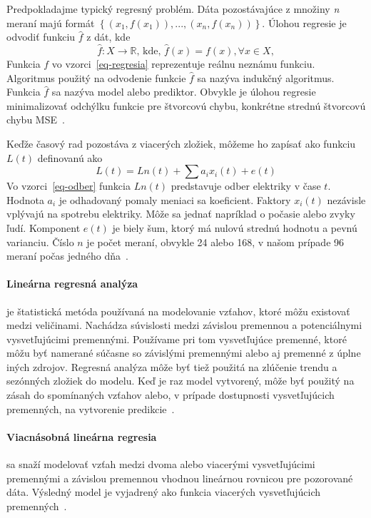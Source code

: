 \documentclass[a4paper,slovak,12pt,appendix]{article}
\begin{document}
Predpokladajme typický regresný problém. Dáta pozostávajúce z množiny \textit{n}
meraní majú formát $\left\{(x_1, f(x_1)), ..., (x_n, f(x_n))\right\}$.
Úlohou regresie je odvodiť funkciu $\hat{f}$ z dát, kde
\begin{equation}
  \hat{f} : X \to \mathbb{R} \text{, kde, } \hat{f}(x) = f(x), \forall x \in X,
  \label{eq-regresia}
\end{equation}
Funkcia $f$ vo vzorci~\ref{eq-regresia} reprezentuje reálnu neznámu
funkciu. Algoritmus použitý na odvodenie funkcie $\hat{f}$ sa nazýva
indukčný algoritmus. Funkcia $\hat{f}$ sa nazýva model alebo
prediktor. Obvykle je úlohou regresie minimalizovať odchýlku funkcie pre
štvorcovú chybu, konkrétne strednú štvorcovú chybu MSE~\cite{Mendes-Moreira2012}.

Keďže časový rad pozostáva z viacerých zložiek, môžeme ho zapísať ako funkciu
$L(t)$ definovanú ako
\begin{equation}
  L(t) = Ln(t) + \sum a_i x_i(t) + e(t)
  \label{eq-odber}
\end{equation}
Vo vzorci~\ref{eq-odber} funkcia $Ln(t)$ predstavuje odber elektriky v čase
$t$. Hodnota $a_i$ je odhadovaný pomaly meniaci sa koeficient. Faktory
$x_i(t)$ nezávisle vplývajú na spotrebu elektriky. Môže sa jednať napríklad
o počasie alebo zvyky ľudí. Komponent $e(t)$ je biely šum, ktorý má nulovú
strednú hodnotu a pevnú varianciu. Číslo $n$ je počet meraní, obvykle 24
alebo 168, v našom prípade 96 meraní počas jedného dňa~\cite{KumarSingh2013}.

\paragraph{Lineárna regresná analýza} je štatistická metóda používaná na
modelovanie vzťahov, ktoré môžu existovať medzi veličinami. Nachádza súvislosti
medzi závislou premennou a potenciálnymi vysvetľujúcimi premennými. Používame
pri tom vysvetľujúce premenné, ktoré môžu byť namerané súčasne so závislými
premennými alebo aj premenné z úplne iných zdrojov. Regresná analýza môže byť
tiež použitá na zlúčenie trendu a sezónných zložiek do modelu. Keď je raz model
vytvorený, môže byť použitý na zásah do spomínaných vzťahov alebo, v prípade
dostupnosti vysvetľujúcich premenných, na vytvorenie predikcie~\cite{Liu1992}.

\paragraph{Viacnásobná lineárna regresia} sa snaží modelovať vzťah medzi dvoma
alebo viacerými vysvetľujúcimi premennými a závislou premennou vhodnou
lineárnou rovnicou pre pozorované dáta. Výsledný model je vyjadrený ako funkcia
viacerých vysvetľujúcich premenných~\cite{Grmanova2016}.
\end{document}
